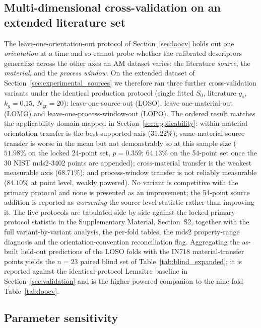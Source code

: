 \documentclass[twocolumn]{sagej}
\begin{document}
\subsection{Multi-dimensional cross-validation on an extended literature set}
\label{sec:multidim_cv}

The leave-one-orientation-out protocol of Section~\ref{sec:loocv} holds out one \emph{orientation} at a time and so cannot probe whether the calibrated descriptors generalize across the other axes an AM dataset varies: the literature \emph{source}, the \emph{material}, and the \emph{process window}. On the extended dataset of Section~\ref{sec:experimental_sources} we therefore ran three further cross-validation variants under the identical production protocol (single fitted $S_0$, literature $g_s$, $k_g = 0.15$, $N_{\mathrm{gr}} = 20$): leave-one-source-out (LOSO), leave-one-material-out (LOMO) and leave-one-process-window-out (LOPO). The ordered result matches the applicability domain mapped in Section~\ref{sec:applicability}: within-material orientation transfer is the best-supported axis ($31.22\%$); same-material source transfer is worse in the mean but not demonstrably so at this sample size ($51.98\%$ on the locked 24-point set, $p = 0.359$; $64.13\%$ on the 54-point set once the 30 NIST mds2-3402 points are appended); cross-material transfer is the weakest measurable axis ($68.71\%$); and process-window transfer is not reliably measurable ($84.10\%$ at point level, weakly powered). No variant is competitive with the primary protocol and none is presented as an improvement; the 54-point source addition is reported as \emph{worsening} the source-level statistic rather than improving it. The five protocols are tabulated side by side against the locked primary-protocol statistic in the Supplementary Material, Section~S2, together with the full variant-by-variant analysis, the per-fold tables, the mds2 property-range diagnosis and the orientation-convention reconciliation flag. Aggregating the as-built held-out predictions of the LOSO folds with the IN718 material-transfer points yields the $n = 23$ paired blind set of Table~\ref{tab:blind_expanded}; it is reported against the identical-protocol Lemaitre baseline in Section~\ref{sec:validation} and is the higher-powered companion to the nine-fold Table~\ref{tab:loocv}.


\subsection{Parameter sensitivity}
\label{sec:sensitivity}
\end{document}
